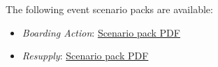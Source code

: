The following event scenario packs are available:

\begin{itemize}

\item \emph{Boarding Action}: \href{https://raw.githubusercontent.com/Eudicods/outworlds-wastes/rules-pdf/boarding-action.pdf}{Scenario pack PDF}

\item \emph{Resupply}: \href{https://raw.githubusercontent.com/Eudicods/outworlds-wastes/rules-pdf/resupply.pdf}{Scenario pack PDF}

\end{itemize}
